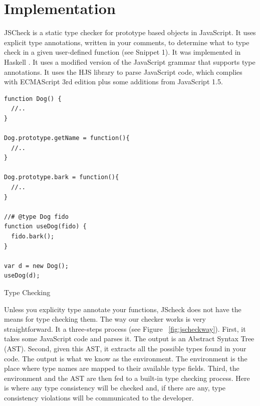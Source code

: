 \documentclass{article}
\begin{document}
\section{Implementation}
JSCheck is a static type checker for prototype based objects in JavaScript. It uses 
explicit type annotations, written in your comments, to determine what to type check 
in a given user-defined function (see Snippet 1). It was implemented in Haskell 
\cite{haskellLanguage}. It uses a modified version of the JavaScript grammar that 
supports type annotations. It uses the HJS library \cite{hjsLibrary} to parse 
JavaScript code, which complies with ECMAScript 3rd edition plus some additions 
from JavaScript 1.5. 

\begin{program}
\begin{verbatim}
function Dog() {
  //..
}

Dog.prototype.getName = function(){
  //..
}

Dog.prototype.bark = function(){
  //..
}

//# @type Dog fido
function useDog(fido) {
  fido.bark();
}

var d = new Dog();
useDog(d);
\end{verbatim}
\caption{Type Checking}
\end{program}

Unless you explicity type annotate your functions, JScheck does not have the means 
for type checking them. The way our checker works is very straightforward. It a
three-steps process (see Figure ~\ref{fig:jscheckway}). First, it takes some JavaScript 
code and parses it. The output is an Abstract Syntax Tree (AST). Second, given this AST, 
it extracts all the possible types found in your code. The output is what we know 
as the environment. The environment is the place where type names are mapped to 
their available type fields. Third, the environment and the AST are then fed to 
a built-in type checking process. Here is where any type consistency will be checked 
and, if there are any, type consistency violations will be communicated to the 
developer. 
\end{document}
